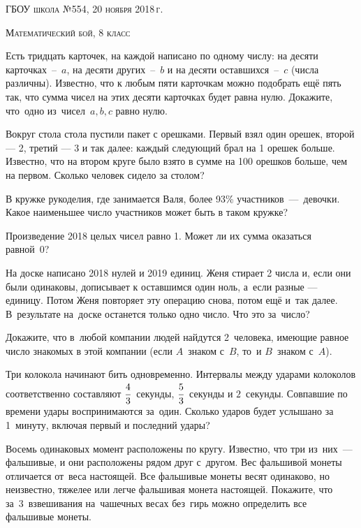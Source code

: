 \begin{flushright}
\textsc{ГБОУ школа №554, 20 ноября 2018\,г.}
\end{flushright}

\begin{center}
\LARGE \textsc{Математический бой, 8 класс}
\end{center}

 Есть тридцать карточек, на каждой написано по одному числу: на десяти карточках~–~$a$,  на десяти других~–~$b$ и на десяти оставшихся~–~$c$ (числа  различны). Известно, что к любым пяти карточкам можно подобрать ещё пять так, что сумма чисел на этих десяти карточках будет равна нулю. Докажите, что~одно из~чисел~$a, b, c$ равно нулю.

 Вокруг стола стола пустили пакет с орешками. Первый взял один орешек, второй — 2, третий — 3 и так далее: каждый следующий брал на 1 орешек больше. Известно, что на втором круге было взято в сумме на 100 орешков больше, чем на первом. Сколько человек сидело за столом?



 В кружке рукоделия, где занимается Валя, более 93\% участников~—~девочки. Какое наименьшее число участников может быть в таком кружке?

 Произведение 2018 целых чисел равно 1. Может ли их сумма оказаться равной~0?


 На доске написано 2018 нулей и 2019 единиц. Женя стирает 2 числа и, если они были одинаковы, дописывает к оставшимся один ноль, а~если разные — единицу. Потом Женя повторяет эту операцию снова, потом ещё и~так далее. В~результате на~доске останется только одно число. Что это за~число?

 Докажите, что в~любой компании людей найдутся 2~человека, имеющие равное число знакомых в этой компании (если $A$~знаком с~$B$, то~и $B$~знаком с~$A$).

 Три колокола начинают бить одновременно. Интервалы между ударами колоколов соответственно составляют $\cfrac43$~секунды, $\cfrac53$~секунды и $2$~секунды. Совпавшие по времени удары воспринимаются за~один. Сколько ударов будет услышано за 1~минуту, включая первый и последний удары?

 Восемь одинаковых момент расположены по кругу. Известно, что три из~них~— фальшивые, и они расположены рядом друг с~другом. Вес фальшивой монеты отличается от~веса настоящей. Все фальшивые монеты весят одинаково, но неизвестно, тяжелее или легче фальшивая монета настоящей. Покажите, что за~3~взвешивания на~чашечных весах без~гирь можно определить все фальшивые монеты. 